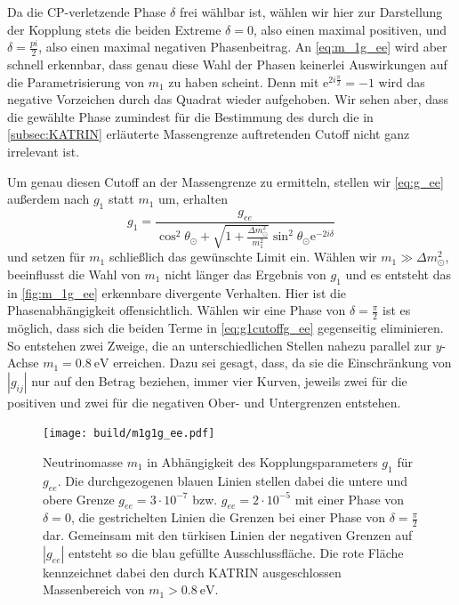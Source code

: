 Da die CP-verletzende Phase $\delta$ frei wählbar ist, wählen wir hier zur Darstellung der Kopplung stets die beiden Extreme $\delta = 0$, also einen maximal positiven, und $\delta = \frac{pi}{2}$, also einen maximal negativen Phasenbeitrag.
An \eqref{eq:m_1g_ee} wird aber schnell erkennbar, dass genau diese Wahl der Phasen keinerlei Auswirkungen auf die Parametrisierung von $m_1$ zu haben scheint.
Denn mit $\mathrm{e}^{2 i \frac{\pi}{2}} = -1$ wird das negative Vorzeichen durch das Quadrat wieder aufgehoben.
Wir sehen aber, dass die gewählte Phase zumindest für die Bestimmung des durch die in \autoref{subsec:KATRIN} erläuterte Massengrenze auftretenden Cutoff nicht ganz irrelevant ist.

Um genau diesen Cutoff an der Massengrenze zu ermitteln, stellen wir \eqref{eq:g_ee} außerdem nach $g_1$ statt $m_1$ um, erhalten
\begin{equation}
    g_1 = \frac{g_{ee}}{\cos^2\theta_\odot + \sqrt{1 + \frac{\Delta m^2_\odot}{m^2_1}} \sin^2\theta_\odot \mathrm{e}^{-2 i \delta}} 
    \label{eq:g1cutoffg_ee}
\end{equation}
und setzen für $m_1$ schließlich das gewünschte Limit ein.
Wählen wir $m_1 \gg \Delta m^2_\odot$, beeinflusst die Wahl von $m_1$ nicht länger das Ergebnis von $g_1$ und es entsteht das in \autoref{fig:m_1g_ee} erkennbare divergente Verhalten.
Hier ist die Phasenabhängigkeit offensichtlich.
Wählen wir eine Phase von $\delta = \frac{\pi}{2}$ ist es möglich, dass sich die beiden Terme in \eqref{eq:g1cutoffg_ee} gegenseitig eliminieren.
So entstehen zwei Zweige, die an unterschiedlichen Stellen nahezu parallel zur $y$-Achse $m_1 = \SI{0.8}{\eV}$ erreichen.
Dazu sei gesagt, dass, da sie die Einschränkung von $|g_{i j}|$ nur auf den Betrag beziehen, immer vier Kurven, jeweils zwei für die positiven und zwei für die negativen Ober- und Untergrenzen entstehen.
\begin{figure}[H]
    \centering
    \texttt{[image: build/m1g1g\_ee.pdf]}
    \caption{Neutrinomasse $m_1$ in Abhängigkeit des Kopplungsparameters $g_1$ für $g_{ee}$. Die durchgezogenen blauen Linien stellen dabei die untere und obere Grenze $g_{ee} = 3 \cdot 10^{-7}$ bzw. $g_{ee} = 2 \cdot 10^{-5}$
            mit einer Phase von $\delta = 0$, die gestrichelten Linien die Grenzen bei einer Phase von $\delta = \frac{\pi}{2}$ dar. Gemeinsam mit den türkisen Linien der negativen Grenzen auf $|g_{ee}|$ entsteht so die blau
            gefüllte Ausschlussfläche. Die rote Fläche kennzeichnet dabei den durch KATRIN ausgeschlossen Massenbereich von $m_1 > \SI{0.8}{\eV}$.}
    \label{fig:m_1g_ee}
\end{figure}
